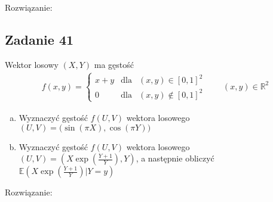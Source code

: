 Rozwiązanie:


\subsection*{Zadanie 41}
Wektor losowy $ (X,Y) $ ma gęstość
\begin{gather*}
f(x,y)=\left \{
\begin{array}{cll}
	x+y & \text{dla} & (x,y)\in [0,1]^2 \\
	 0  & \text{dla} & (x,y)\notin [0,1]^2
\end{array}
\right .
\qquad
(x,y)\in \mathbb R ^2
\end{gather*}
\begin{enumerate}[a)]
\item Wyznaczyć gęstość $ f(U,V) $ wektora losowego $ (U,V) =  \bigl(\sin \left(\pi X\right),\cos\left (\pi Y\right)\bigr) $
\item Wyznaczyć gęstość $ f(U,V) $ wektora losowego $ (U,V)=\left(X\exp \left(\frac{Y+1}{Y}\right),Y\right) $, a następnie obliczyć $ \mathbb E \left(X\exp \left(\frac{Y+1}{Y}\right)|Y=y\right) $
\end{enumerate}
Rozwiązanie:

